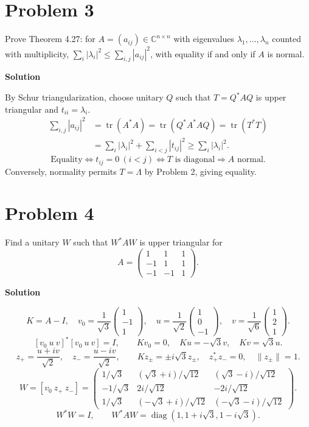 \documentclass[UTF8,10pt,letterpaper,fontset=fandol]{ctexart}
\newcommand{\C}{\mathbb C}
\DeclareMathOperator{\tr}{tr}
\begin{document}
\section{Problem 3}
Prove Theorem 4.27: for $A=(a_{ij})\in\C^{n\times n}$ with eigenvalues $\lambda_1,\ldots,\lambda_n$ counted with multiplicity, $\sum_i|\lambda_i|^2\le\sum_{i,j}|a_{ij}|^2$, with equality if and only if $A$ is normal.
\par{}\textbf{Solution}\par
By Schur triangularization, choose unitary $Q$ such that $T=Q^*AQ$ is upper triangular and $t_{ii}=\lambda_i$.
\begin{align*}
 \sum_{i,j}|a_{ij}|^2
 &=\tr(A^*A)=\tr(Q^*A^*A Q)=\tr(T^*T)\\
 &=\sum_i|\lambda_i|^2+\sum_{i<j}|t_{ij}|^2
 \ge\sum_i|\lambda_i|^2.
\end{align*}
\[
 \text{Equality}\iff t_{ij}=0\ (i<j)
 \iff T\text{ is diagonal}\Longrightarrow A\text{ normal}.
\]
Conversely, normality permits $T=\Lambda$ by Problem 2, giving equality.
\newpage
\section{Problem 4}
Find a unitary $W$ such that $W^*AW$ is upper triangular for
\[
 A=\begin{pmatrix}1&1&1\\-1&1&1\\-1&-1&1\end{pmatrix}.
\]

\par{}\textbf{Solution}\par

\[
 K=A-I,\quad
 v_0=\frac1{\sqrt3}\begin{pmatrix}1\\-1\\1\end{pmatrix},\quad
 u=\frac1{\sqrt2}\begin{pmatrix}1\\0\\-1\end{pmatrix},\quad
 v=\frac1{\sqrt6}\begin{pmatrix}1\\2\\1\end{pmatrix}.
\]
\[
 [v_0\ u\ v]^*[v_0\ u\ v]=I,\qquad
 Kv_0=0,\quad Ku=-\sqrt3v,\quad Kv=\sqrt3u.
\]
\[
 z_+=\frac{u+iv}{\sqrt2},\quad z_-=\frac{u-iv}{\sqrt2},\qquad
 Kz_\pm=\pm i\sqrt3z_\pm,\quad z_+^*z_-=0,\quad\|z_\pm\|=1.
\]
\[
 \boxed{W=[v_0\ z_+\ z_-]=
 \begin{pmatrix}
 1/\sqrt3&(\sqrt3+i)/\sqrt{12}&(\sqrt3-i)/\sqrt{12}\\
 -1/\sqrt3&2i/\sqrt{12}&-2i/\sqrt{12}\\
 1/\sqrt3&(-\sqrt3+i)/\sqrt{12}&(-\sqrt3-i)/\sqrt{12}
 \end{pmatrix}}.
\]
\[
 W^*W=I,\qquad
 \boxed{W^*AW=\operatorname{diag}(1,1+i\sqrt3,1-i\sqrt3)}.
\]
\end{document}
